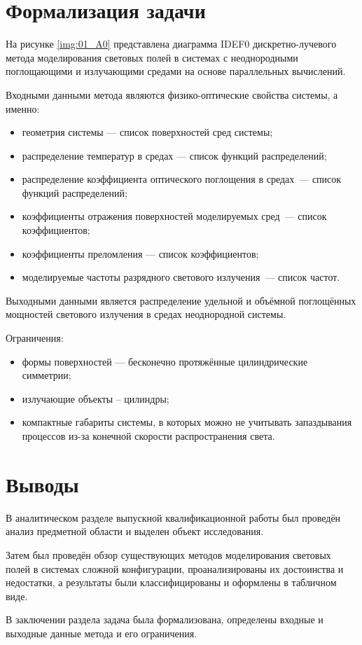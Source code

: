 \section{Формализация задачи}

На рисунке \ref{img:01_A0} представлена диаграмма IDEF0 дискретно-лучевого метода моделирования световых полей в системах с неоднородными поглощающими и излучающими средами на основе параллельных вычислений.


Входными данными метода являются физико-оптические свойства системы, а именно:
\begin{itemize}
	\item геометрия системы — список поверхностей сред системы;
	\item распределение температур в средах — список функций распределений;
	\item распределение коэффициента оптического поглощения в средах~— список функций распределений;
	\item коэффициенты отражения поверхностей моделируемых сред~— список коэффициентов;
	\item коэффициенты преломления — список коэффициентов;
	\item моделируемые частоты разрядного светового излучения~— список частот.
\end{itemize}

Выходными данными является распределение удельной и объёмной поглощённых мощностей светового излучения в средах неоднородной системы.

Ограничения:
\begin{itemize}
	\item формы поверхностей — бесконечно протяжённые цилиндрические симметрии;
	\item излучающие объекты – цилиндры;
	\item компактные габариты системы, в которых можно не учитывать запаздывания процессов из-за конечной скорости распространения света.
\end{itemize}

\section*{Выводы}

В аналитическом разделе выпускной квалификационной работы был проведён анализ предметной области и выделен объект исследования.

Затем был проведён обзор существующих методов моделирования световых полей в системах сложной конфигурации, проанализированы их достоинства и недостатки, а результаты были классифицированы и оформлены в табличном виде.

В заключении раздела задача была формализована, определены входные и выходные данные метода и его ограничения.
